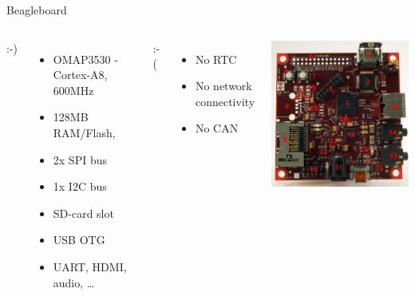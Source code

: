 \documentclass{beamer}
\begin{document}
\begin{frame}{Beagleboard}
\begin{columns}[c]

:-)
\begin{itemize}
\item OMAP3530 - Cortex-A8, 600MHz
\item 128MB RAM/Flash,
\item 2x SPI bus 
\item 1x I2C bus 
\item SD-card slot
\item USB OTG
\item UART, HDMI, audio, \ldots
\end{itemize}

:-(
\begin{itemize}
\item No RTC
\item No network connectivity
\item No CAN
\end{itemize}

\includegraphics[width=\textwidth]{../img/beagleboard}

\end{columns}
\end{frame}
\end{document}
